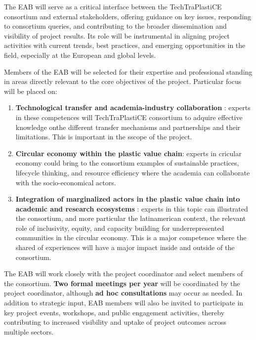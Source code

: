 \documentclass[
  12pt,
  oneside]{book}
\begin{document}
The EAB will serve as a critical interface between the TechTraPlastiCE
consortium and external stakeholders, offering guidance on key issues,
responding to consortium queries, and contributing to the broader
dissemination and visibility of project results. Its role will be
instrumental in aligning project activities with current trends, best
practices, and emerging opportunities in the field, especially at the
European and global levels.

Members of the EAB will be selected for their expertise and professional
standing in areas directly relevant to the core objectives of the
project. Particular focus will be placed on:

\begin{enumerate}
\def\labelenumi{\arabic{enumi}.}
\item
  \textbf{Technological transfer and academia-industry collaboration} :
  experts in these competences will TechTraPlastiCE consortium to
  adquire effective knowledge onthe different transfer mechanisms and
  partnerships and their limitations. This is important in the sscope of
  the project.
\item
  \textbf{Circular economy within the plastic value chain}: experts in
  cricular economy could bring to the consortium examples of sustainable
  practices, lifecycle thinking, and resource efficiency where the
  academia can collaborate with the socio-economical actors.
\item
  \textbf{Integration of marginalized actors in the plastic value chain
  into academic and research ecosystems} : experts in this topic can
  illustrated the consortium, and more particular the latinamerican
  context, the relevant role of inclusivity, equity, and capacity
  building for underrepresented communities in the circular economy.
  This is a major competence where the shared of experiences will have a
  major impact inside and outside of the consortium.
\end{enumerate}

The EAB will work closely with the project coordinator and select
members of the consortium. \textbf{Two formal meetings per year} will be
coordinated by the project coordinator, although \textbf{ad hoc
consultations} may occur as needed. In addition to strategic input, EAB
members will also be invited to participate in key project events,
workshops, and public engagement activities, thereby contributing to
increased visibility and uptake of project outcomes across multiple
sectors.
\end{document}
